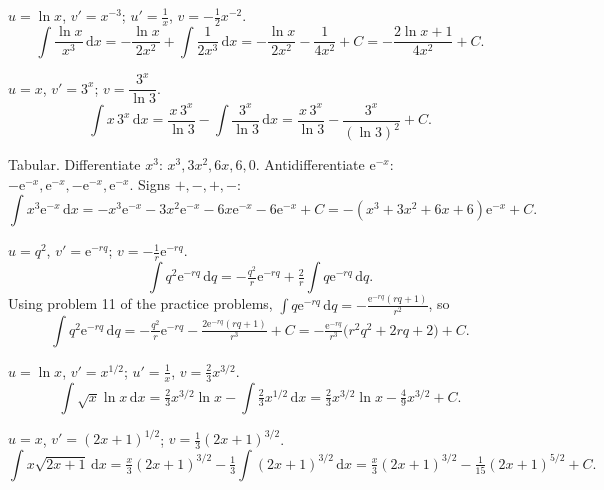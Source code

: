 \begin{solutions}
  \item $u=\ln x$, $v'=x^{-3}$; $u'=\tfrac1x$, $v=-\tfrac12 x^{-2}$.
        \[
          \int \frac{\ln x}{x^{3}}\,\mathrm{d}x
            = -\frac{\ln x}{2x^{2}}+\int \frac{1}{2x^{3}}\,\mathrm{d}x
            = -\frac{\ln x}{2x^{2}}-\frac{1}{4x^{2}}+C
            = -\frac{2\ln x+1}{4x^{2}}+C .
        \]

  \item $u=x$, $v'=3^{x}$; $v=\dfrac{3^{x}}{\ln 3}$.
        \[
          \int x\,3^{x}\,\mathrm{d}x
            = \frac{x\,3^{x}}{\ln 3}-\int \frac{3^{x}}{\ln 3}\,\mathrm{d}x
            = \frac{x\,3^{x}}{\ln 3}-\frac{3^{x}}{(\ln 3)^{2}}+C .
        \]

  \item Tabular. Differentiate $x^{3}$: $x^{3},3x^{2},6x,6,0$.
        Antidifferentiate $\mathrm{e}^{-x}$:
        $-\mathrm{e}^{-x},\mathrm{e}^{-x},-\mathrm{e}^{-x},\mathrm{e}^{-x}$.
        Signs $+,-,+,-$:
        \[
          \int x^{3}\mathrm{e}^{-x}\,\mathrm{d}x
            = -x^{3}\mathrm{e}^{-x}-3x^{2}\mathrm{e}^{-x}-6x\mathrm{e}^{-x}
              -6\mathrm{e}^{-x}+C
            = -(x^{3}+3x^{2}+6x+6)\mathrm{e}^{-x}+C .
        \]

  \item $u=q^{2}$, $v'=\mathrm{e}^{-rq}$; $v=-\tfrac1r\mathrm{e}^{-rq}$.
        \[
          \int q^{2}\mathrm{e}^{-rq}\,\mathrm{d}q
            = -\tfrac{q^{2}}{r}\mathrm{e}^{-rq}+\tfrac2r\int q\mathrm{e}^{-rq}\,\mathrm{d}q .
        \]
        Using problem 11 of the practice problems,
        $\int q\mathrm{e}^{-rq}\,\mathrm{d}q = -\tfrac{\mathrm{e}^{-rq}(rq+1)}{r^{2}}$, so
        \[
          \int q^{2}\mathrm{e}^{-rq}\,\mathrm{d}q
            = -\tfrac{q^{2}}{r}\mathrm{e}^{-rq}-\tfrac{2\mathrm{e}^{-rq}(rq+1)}{r^{3}}+C
            = -\tfrac{\mathrm{e}^{-rq}}{r^{3}}\bigl(r^{2}q^{2}+2rq+2\bigr)+C .
        \]

  \item $u=\ln x$, $v'=x^{1/2}$; $u'=\tfrac1x$, $v=\tfrac23 x^{3/2}$.
        \[
          \int \sqrt{x}\ln x\,\mathrm{d}x
            = \tfrac23 x^{3/2}\ln x - \int \tfrac23 x^{1/2}\,\mathrm{d}x
            = \tfrac23 x^{3/2}\ln x - \tfrac49 x^{3/2}+C .
        \]

  \item $u=x$, $v'=(2x+1)^{1/2}$; $v=\tfrac13(2x+1)^{3/2}$.
        \[
          \int x\sqrt{2x+1}\,\mathrm{d}x
            = \tfrac{x}{3}(2x+1)^{3/2}-\tfrac13\int (2x+1)^{3/2}\,\mathrm{d}x
            = \tfrac{x}{3}(2x+1)^{3/2}-\tfrac{1}{15}(2x+1)^{5/2}+C .
        \]


\end{solutions}
